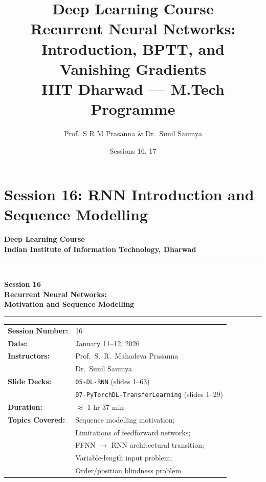 \documentclass[12pt,a4paper]{article}
\title{%
  {\Large\bfseries Deep Learning Course}\\[6pt]
  {\LARGE Recurrent Neural Networks: Introduction, BPTT, and Vanishing Gradients}\\[4pt]
  {\normalsize IIIT Dharwad --- M.Tech Programme}
}
\author{Prof.\ S R M Prasanna \& Dr.\ Sunil Saumya}
\date{Sessions 16, 17}
\begin{document}
\maketitle
\tableofcontents
\clearpage

\part{Session 16: RNN Introduction and Sequence Modelling}

\begin{titlepage}
  \centering
  \vspace*{2cm}

  {\LARGE\bfseries Deep Learning Course\\[0.4em]
   Indian Institute of Information Technology, Dharwad}

  \vspace{1.5cm}
  \rule{\linewidth}{0.8pt}\\[0.4em]
  {\Huge\bfseries Session 16}\\[0.5em]
  {\Large\bfseries Recurrent Neural Networks:\\[0.3em]
   Motivation and Sequence Modelling}
  \\[0.4em]\rule{\linewidth}{0.8pt}

  \vspace{1.5cm}

  \begin{tabular}{ll}
    \textbf{Session Number:}  & 16 \\[4pt]
    \textbf{Date:}            & January 11--12, 2026 \\[4pt]
    \textbf{Instructors:}     & Prof.\ S.\ R.\ Mahadeva Prasanna \\
                              & Dr.\ Sunil Saumya \\[4pt]
    \textbf{Slide Decks:}     & \texttt{05-DL-RNN} (slides 1--63) \\
                              & \texttt{07-PyTorchDL-TransferLearning} (slides 1--29) \\[4pt]
    \textbf{Duration:}        & $\approx$ 1 hr 37 min \\[4pt]
    \textbf{Topics Covered:}  & Sequence modelling motivation; \\
                              & Limitations of feedforward networks; \\
                              & FFNN $\to$ RNN architectural transition; \\
                              & Variable-length input problem; \\
                              & Order/position blindness problem \\
  \end{tabular}


\end{titlepage}
\end{document}
